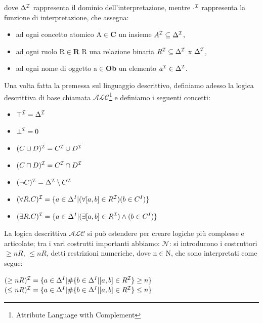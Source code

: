 \documentclass[a4paper,11pt]{article}
\newcommand{\alc}{%
   \ensuremath{\mathcal{ALC}}\xspace}
\newcommand{\I}{%
        \ensuremath{\mathcal{I}}\xspace}
\newcommand{\N}{%
  \ensuremath{\mathcal{N}}\xspace}
\begin{document}
\begin{enumerate}
\begin{enumerate}[label*=\arabic*.]
dove $\Delta^\I$ rappresenta il dominio dell'interpretazione, 
mentre $\cdot^\I$ rappresenta la funzione di interpretazione, che assegna:
\begin{itemize}
\item ad ogni concetto atomico A$\in$\textbf{C} un insieme  $A^{\I}\subseteq \Delta^\I$,\newline
\item ad ogni ruolo R$\in$\textbf{R} R una relazione binaria $R^{\I}\subseteq \Delta^{\I}$ x $\Delta^{\I} $,\newline
\item ad ogni nome di oggetto a$\in$\textbf{Ob} un elemento $a^{\I}\in \Delta^\I$.
\end{itemize} 
Una volta fatta la premessa sul linguaggio descrittivo, definiamo adesso la logica descrittiva di base chiamata $\alc$\footnote{Attribute Language with Complement} e definiamo i seguenti concetti:
\begin{itemize}
\item $\top^{\I}=\Delta^\I$
\item $\bot^{\I}=0$
\item $(C \sqcup  D)^{\I}=C^{\I} \cup D^{\I} $
\item $(C \sqcap  D)^{\I}=C^{\I} \cap D^{\I} $
\item $(\neg C)^{\I}=\Delta^{\I} \setminus C^{\I} $
\item $(\forall R.C)^{\I}=\{a \in \Delta^{I} | (\forall[a,b] \in R^{\I}) (b \in C^{I})\}$
\item $(\exists R.C)^{\I}=\{a \in \Delta^{I} | (\exists[a,b] \in R^{\I})\wedge (b \in C^{I})\}$
\end{itemize}
La logica descrittiva $\alc$ si può estendere per creare logiche più complesse e articolate; tra i vari costrutti importanti abbiamo:\newline
$\N$: si introducono i costruttori $\geq nR$, $\leq nR$, detti restrizioni numeriche, dove n$\in$N, che sono interpretati come segue:\newline
\begin{center}
		$(\geq nR)^{\I}=\{a \in \Delta^{I}|\#\{b \in \Delta^{I} |[a,b] \in R^{\I}\}\geq n\}$\newline$(\leq nR)^{\I}=\{a \in \Delta^{I}|\#\{b \in \Delta^{I} |[a,b] \in R^{\I}\}\leq n\}$\newline
\end{center}


\end{enumerate}
\end{enumerate}
\end{document}
